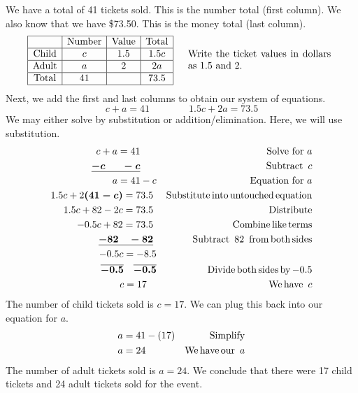\begin{example}
We have a total of 41 tickets sold.  This is the number total (first column).  We also know that we have \$73.50.  This is the money total (last column).
 \begin{eqnarray*}
    \begin{array}{|c|c|c|c|}
      \hline
      & \tmop{Number} & \tmop{Value} & \tmop{Total}\\
      \hline
      \tmop{Child} & c & 1.5 & 1.5 c\\
      \hline
      \tmop{Adult} & a & 2 & 2 a\\
      \hline
      \tmop{Total} & 41 &  & 73.5\\
      \hline
    \end{array} &  & \begin{array}{p{0.425\textwidth}}
      \tmop{Write} \tmop{the} \tmop{ticket} \tmop{values} \tmop{in} \tmop{dollars} \tmop{as} 1.5 \tmop{and} 2.
    \end{array}%
		\end{eqnarray*}
		Next, we add the first and last columns to obtain our system of equations.
		$$c + a = 41\qquad\qquad 1.5 c + 2 a = 73.5$$
		We may either solve by substitution or addition/elimination.  Here, we will use substitution.
	\begin{eqnarray*}
    c + a = 41~~~~~ &  & \text{Solve~for~} a\\
    \tmmathbf{\underline{- c ~~~~~- c}}~~~~~ &  & \tmop{Subtract~} c\\
    a = 41 - c &  & \text{Equation~for~} a\\
    1.5 c + 2 \tmmathbf{(41 - c)} = 73.5~ &  & \tmop{Substitute} \tmop{into}
    \tmop{untouched} \tmop{equation}\\
    1.5 c + 82 - 2 c = 73.5~ &  & \tmop{Distribute}\\
    - 0.5 c + 82 = 73.5~ &  & \tmop{Combine} \tmop{like} \tmop{terms}\\
    \tmmathbf{\underline{- 82 ~~~- 82}}~ &  & \tmop{Subtract~} 82 \tmop{~from} \tmop{both}
    \tmop{sides}\\
    - 0.5 c = - 8.5 &  &\\
    \tmmathbf{\overline{- 0.5} ~~~ \overline{- 0.5}} &  &  \tmop{Divide} \tmop{both} \tmop{sides} \tmop{by} -
    0.5\\
    c = 17~~~ &  & \tmop{We} \tmop{have~} c%
 \end{eqnarray*}
The number of child tickets sold is $c=17$.  We can plug this back into our equation for $a$.
 \begin{eqnarray*}
    a = 41 - (17) &  & \operatorname{Simplify}\\
    a = 24~~~~~~~~~ &  & \operatorname{We} \operatorname{have} \operatorname{our~} a
	\end{eqnarray*}
The number of adult tickets sold is $a=24$.  We conclude that there were 17 child tickets and 24 adult tickets sold for the event.
\end{example}

